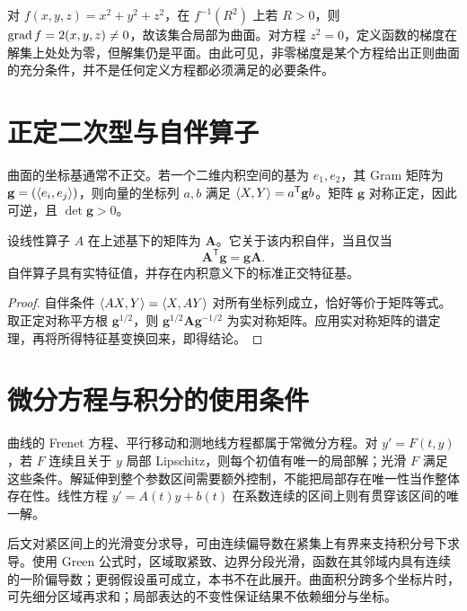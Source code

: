 \begin{example}[隐式球面与失效的判别条件]
对 $f(x,y,z)=x^2+y^2+z^2$，在 $f^{-1}(R^2)$ 上若 $R>0$，则 $\operatorname{grad} f=2(x,y,z)\ne0$，故该集合局部为曲面。对方程 $z^2=0$，定义函数的梯度在解集上处处为零，但解集仍是平面。由此可见，非零梯度是某个方程给出正则曲面的充分条件，并不是任何定义方程都必须满足的必要条件。
\end{example}

\section{正定二次型与自伴算子}
曲面的坐标基通常不正交。若一个二维内积空间的基为 $e_1,e_2$，其 Gram 矩阵为 $\mathbf g=(\langle e_i,e_j\rangle)$，则向量的坐标列 $a,b$ 满足 $\langle X,Y\rangle=a^{\mathsf T}\mathbf g b$。矩阵 $\mathbf g$ 对称正定，因此可逆，且 $\det\mathbf g>0$。

\begin{proposition}[非正交基下的自伴性]
设线性算子 $A$ 在上述基下的矩阵为 $\mathbf A$。它关于该内积自伴，当且仅当
\[
 \mathbf A^{\mathsf T}\mathbf g=\mathbf g\mathbf A.
\]
自伴算子具有实特征值，并存在内积意义下的标准正交特征基。
\label{prop:dg-selfadjoint}
\end{proposition}
\begin{proof}
自伴条件 $\langle AX,Y\rangle=\langle X,AY\rangle$ 对所有坐标列成立，恰好等价于矩阵等式。取正定对称平方根 $\mathbf g^{1/2}$，则 $\mathbf g^{1/2}\mathbf A\mathbf g^{-1/2}$ 为实对称矩阵。应用实对称矩阵的谱定理，再将所得特征基变换回来，即得结论。
\end{proof}

\section{微分方程与积分的使用条件}
曲线的 Frenet 方程、平行移动和测地线方程都属于常微分方程。对 $y'=F(t,y)$，若 $F$ 连续且关于 $y$ 局部 Lipschitz，则每个初值有唯一的局部解；光滑 $F$ 满足这些条件。解延伸到整个参数区间需要额外控制，不能把局部存在唯一性当作整体存在性。线性方程 $y'=A(t)y+b(t)$ 在系数连续的区间上则有贯穿该区间的唯一解。

后文对紧区间上的光滑变分求导，可由连续偏导数在紧集上有界来支持积分号下求导。使用 Green 公式时，区域取紧致、边界分段光滑，函数在其邻域内具有连续的一阶偏导数；更弱假设虽可成立，本书不在此展开。曲面积分跨多个坐标片时，可先细分区域再求和；局部表达的不变性保证结果不依赖细分与坐标。

